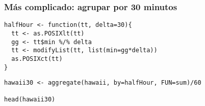 \documentclass[bigger]{beamer}
\begin{document}
\begin{frame}[fragile]
\frametitle{Más complicado: agrupar por 30 minutos}
\label{sec-3-2-4}


\lstset{language=R}
\begin{lstlisting}
halfHour <- function(tt, delta=30){
  tt <- as.POSIXlt(tt)
  gg <- tt$min %/% delta
  tt <- modifyList(tt, list(min=gg*delta))
  as.POSIXct(tt)
}
\end{lstlisting}


\lstset{language=R}
\begin{lstlisting}
hawaii30 <- aggregate(hawaii, by=halfHour, FUN=sum)/60

head(hawaii30)
\end{lstlisting}




  
  
  
  
  
  
  
  
  
\end{frame}
\end{document}
